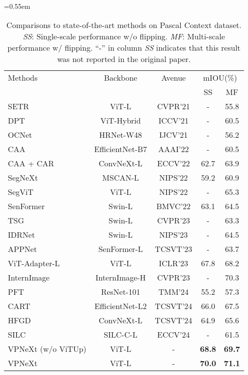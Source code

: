 \begin{table}[ht]
\centering
\small
\caption{
Comparisons to state-of-the-art methods on Pascal Context dataset.
%
\textit{SS}: Single-scale performance w/o flipping.
\textit{MF}: Multi-scale performance w/ flipping.
``-'' in column \textit{SS} indicates that this result was not reported in the original paper.
}
\resizebox{\linewidth}{!}
{\def\arraystretch{1} \tabcolsep=0.55em 
\begin{tabular}{l|c|c|c|c}
\toprule%
Methods & Backbone & Avenue &\multicolumn{2}{c}{mIOU(\%)} \\
& & & SS & MF \\
\midrule
\midrule
SETR~\cite{cSETR}           & ViT-L           & CVPR'21 & - & 55.8 \\
DPT~\cite{cDPT}             & ViT-Hybrid      & ICCV'21 & - & 60.5 \\
OCNet~\cite{cOCNet}         & HRNet-W48       & IJCV'21 & - & 56.2 \\
CAA~\cite{cCAA}             & EfficientNet-B7 & AAAI'22 & - & 60.5 \\
CAA + CAR~\cite{cCAR}        & ConvNeXt-L      & ECCV'22 & 62.7 & 63.9 \\
SegNeXt~\cite{cSegNeXt}     & MSCAN-L         & NIPS'22 & 59.2 & 60.9 \\
SegViT~\cite{cSegViT}       & ViT-L            & NIPS'22 & - & 65.3 \\
SenFormer~\cite{cSenFormer}  & Swin-L          & BMVC'22 & 63.1 & 64.5\\
TSG~\cite{cTSG}             & Swin-L           & CVPR'23 & - & 63.3 \\
IDRNet~\cite{cIDRNet}        & Swin-L           & NIPS'23 & - & 64.5 \\
APPNet~\cite{cAPPNet}       &SenFormer-L       & TCSVT'23 & - & 63.7 \\
ViT-Adapter-L~\cite{cViTAdapter} & ViT-L       & ICLR'23 & 67.8 & 68.2 \\
InternImage~\cite{cInternImage} & InternImage-H & CVPR'23 & - & 70.3 \\
PFT~\cite{cPFT}             & ResNet-101       & TMM'24 & 55.2 & 57.3 \\
CART~\cite{cCART}           &EfficientNet-L2   & TCSVT'24 & 66.0 & 67.5 \\
HFGD~\cite{cHFGD}           &ConvNeXt-L        & TCSVT'24 & 64.9 & 65.6 \\
SILC~\cite{cSILC}           &SILC-C-L          & ECCV'24 & - & 61.5 \\
\midrule%
VPNeXt (w/o ViTUp)         & ViT-L & - & \textbf{68.8} & \textbf{69.7} \\
VPNeXt          & ViT-L & - & \textbf{70.0} & \textbf{71.1}  \\
\bottomrule%
\end{tabular}
}
\label{tab:SOTA-PascalContext}
\end{table}
